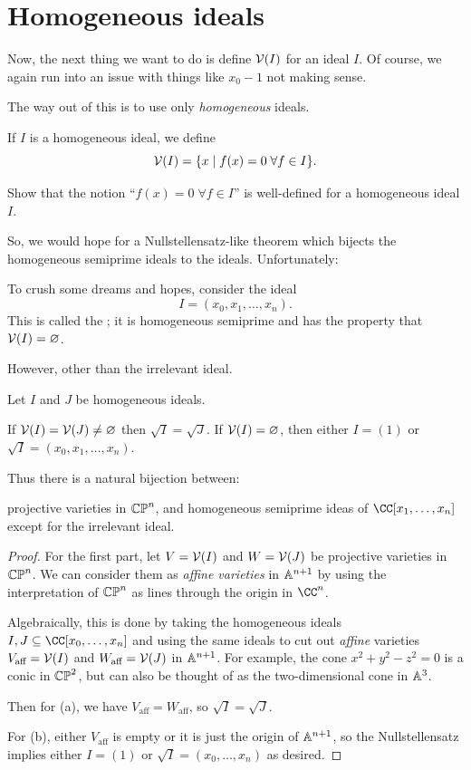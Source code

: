 \documentclass[11pt]{scrreprt}
\begin{document}
\section{Homogeneous ideals}
Now, the next thing we want to do is define $\mathcal V(I)$ for an ideal $I$.
Of course, we again run into an issue with things like $x_0-1$ not
making sense. 

The way out of this is to use only \emph{homogeneous} ideals.
\begin{definition}
	If $I$ is a homogeneous ideal, we define
	\[ \mathcal V(I) = \{ x \mid f(x) = 0 \; \forall f \in I\}. \]
\end{definition}
\begin{exercise}
	Show that the notion ``$f(x) = 0 \; \forall f \in I$''
	is well-defined for a homogeneous ideal $I$.
\end{exercise}
So, we would hope for a Nullstellensatz-like theorem
which bijects the homogeneous semiprime ideals to the ideals.
Unfortunately:
\begin{example}
	To crush some dreams and hopes, consider the ideal
	\[ I = (x_0, x_1, \dots, x_n). \]
	This is called the ;
	it is homogeneous semiprime
	and has the property that $\mathcal V(I) = \varnothing$.
\end{example}

However, other than the irrelevant ideal.
\begin{theorem}
	Let $I$ and $J$ be homogeneous ideals. 
	\begin{enumerate}[(a)]
		\ii If $\mathcal V(I) = \mathcal V(J) \neq \varnothing$ then $\sqrt I = \sqrt J$.
		\ii If $\mathcal V(I) = \varnothing$, then either $I = (1)$
		or $\sqrt I = (x_0, x_1, \dots, x_n)$.
	\end{enumerate}
	Thus there is a natural bijection between:
	\begin{itemize}
		\ii projective varieties in $\mathbb{CP}^n$, and
		\ii homogeneous semiprime ideas of $\CC[x_1, \dots, x_n]$ 
		except for the irrelevant ideal. 
	\end{itemize}
\end{theorem}
\begin{proof}
	For the first part, let $V = \mathcal V(I)$ and $W = \mathcal V(J)$
	be projective varieties in $\mathbb{CP}^n$.
	We can consider them as \emph{affine varieties} in $\mathbb A^{n+1}$
	by using the interpretation of $\mathbb{CP}^n$
	as lines through the origin in $\CC^n$.

	Algebraically, this is done by taking the homogeneous ideals
	$I, J \subseteq \CC[x_0, \dots, x_n]$
	and using the same ideals to cut out \emph{affine} varieties
	$V_{\text{aff}} = \mathcal V(I)$ and $W_{\text{aff}} = \mathcal V(J)$ in $\mathbb A^{n+1}$.
	For example, the cone $x^2+y^2-z^2=0$ is a conic in $\mathbb{CP}^2$,
	but can also be thought of as the two-dimensional cone in $\mathbb A^3$.

	Then for (a), we have $V_{\text{aff}} = W_{\text{aff}}$,
	so $\sqrt I = \sqrt J$.

	For (b), either $V_{\text{aff}}$ is empty 
	or it is just the origin of $\mathbb A^{n+1}$,
	so the Nullstellensatz implies either $I = (1)$
	or $\sqrt I = (x_0, \dots, x_n)$ as desired.
\end{proof}
\end{document}
